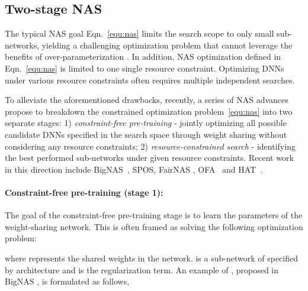 \documentclass[final]{cvpr}
\theoremstyle{definition}
\begin{document}
\iffalse
Most existing NAS methods are based on black-box optimization
techniques, including reinforcement learning \cite{zoph2016neural}
and evolutionary algorithms \cite{}.  
However, these methods are often extremely time-consuming due to
the enormous search space of possible architectures and the high cost for evaluating the performance of each candidate network. More recent approaches have made the search more efficient by using
weight-sharing \cite{cai2018proxylessnas, pham2018efficient, liu2018darts, wu2019fbnet}.
\fi

\subsection{Two-stage NAS}
The typical NAS goal Eqn.~\eqref{equ:nas} limits the search scope to only small sub-networks, yielding a challenging optimization problem that cannot leverage the benefits of over-parameterization \cite{allen2019convergence, cao2019generalization}.
In addition, NAS optimization defined in Eqn.~\eqref{equ:nas} is limited to one single resource constraint. Optimizing DNNs under various resource constraints often requires multiple independent searches. 

To alleviate the aforementioned drawbacks, 
recently, a series of NAS advances propose to breakdown the constrained optimization problem~\eqref{equ:nas} into two separate stages: 
1) \emph{constraint-free pre-training} - jointly optimizing all possible candidate DNNs specified in the search space through weight sharing  without considering any resource constraints;
2) \emph{resource-constrained search} - identifying the best performed sub-networks under given resource constraints. 
Recent work in this direction include BigNAS~\cite{yu2020bignas}, SPOS\cite{guo2020single}, FairNAS \cite{chu2019fairnas}, OFA~\cite{cai2019once} and HAT~\cite{wang2020hat}.

\paragraph{Constraint-free pre-training (stage 1):}
The goal of the constraint-free pre-training stage is to learn the parameters of the weight-sharing network. 
This is often framed as solving the following optimization problem: 

where  represents the shared weights in the network.  is a sub-network of  specified by architecture  and 
 is the regularization term.
An example of , proposed in BigNAS \cite{yu2020bignas}, is formulated as follows,
\end{document}
